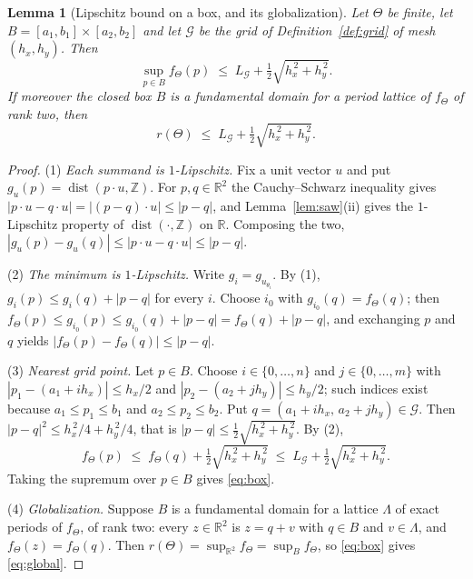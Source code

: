 \documentclass[11pt]{article}
\theoremstyle{plain}
\newtheorem{lemma}[theorem]{Lemma}
\theoremstyle{definition}
\theoremstyle{remark}
\newcommand{\dZ}{\operatorname{dist}}
\newcommand{\R}{\mathbb{R}}
\newcommand{\Z}{\mathbb{Z}}
\begin{document}
\begin{lemma}[Lipschitz bound on a box, and its globalization]
\label{lem:box}
Let $\Theta$ be finite, let $B=[a_1,b_1]\times[a_2,b_2]$ and let $\mathcal{G}$ be the grid of
Definition~\ref{def:grid} of mesh $(h_x,h_y)$. Then
\begin{equation}
\sup_{p\in B}f_\Theta(p)\;\le\;L_{\mathcal{G}}+\tfrac12\sqrt{h_x^{\,2}+h_y^{\,2}} .
\label{eq:box}
\end{equation}
If moreover the closed box $B$ is a fundamental domain for a period lattice of $f_\Theta$ of rank two,
then
\begin{equation}
r(\Theta)\;\le\;L_{\mathcal{G}}+\tfrac12\sqrt{h_x^{\,2}+h_y^{\,2}} .
\label{eq:global}
\end{equation}
\end{lemma}

\begin{proof}
(1) \emph{Each summand is $1$-Lipschitz.} Fix a unit vector $u$ and put
$g_u(p)=\dZ(p\cdot u,\Z)$. For $p,q\in\R^2$ the Cauchy--Schwarz inequality gives
$|p\cdot u-q\cdot u|=|(p-q)\cdot u|\le|p-q|$, and Lemma~\ref{lem:saw}(ii) gives the $1$-Lipschitz
property of $\dZ(\cdot,\Z)$ on $\R$. Composing the two,
$|g_u(p)-g_u(q)|\le|p\cdot u-q\cdot u|\le|p-q|$.

(2) \emph{The minimum is $1$-Lipschitz.} Write $g_i=g_{u_{\theta_i}}$. By (1),
$g_i(p)\le g_i(q)+|p-q|$ for every $i$. Choose $i_0$ with $g_{i_0}(q)=f_\Theta(q)$; then
$f_\Theta(p)\le g_{i_0}(p)\le g_{i_0}(q)+|p-q|=f_\Theta(q)+|p-q|$, and exchanging $p$ and $q$ yields
$|f_\Theta(p)-f_\Theta(q)|\le|p-q|$.

(3) \emph{Nearest grid point.} Let $p\in B$. Choose $i\in\{0,\dots,n\}$ and $j\in\{0,\dots,m\}$ with
$|p_1-(a_1+ih_x)|\le h_x/2$ and $|p_2-(a_2+jh_y)|\le h_y/2$; such indices exist because
$a_1\le p_1\le b_1$ and $a_2\le p_2\le b_2$. Put $q=(a_1+ih_x,\,a_2+jh_y)\in\mathcal{G}$. Then
$|p-q|^2\le h_x^{\,2}/4+h_y^{\,2}/4$, that is $|p-q|\le\tfrac12\sqrt{h_x^{\,2}+h_y^{\,2}}$. By (2),
\[
f_\Theta(p)\;\le\;f_\Theta(q)+\tfrac12\sqrt{h_x^{\,2}+h_y^{\,2}}
\;\le\;L_{\mathcal{G}}+\tfrac12\sqrt{h_x^{\,2}+h_y^{\,2}} .
\]
Taking the supremum over $p\in B$ gives \eqref{eq:box}.

(4) \emph{Globalization.} Suppose $B$ is a fundamental domain for a lattice $\Lambda$ of exact periods
of $f_\Theta$, of rank two: every $z\in\R^2$ is $z=q+v$ with $q\in B$ and $v\in\Lambda$, and
$f_\Theta(z)=f_\Theta(q)$. Then $r(\Theta)=\sup_{\R^2}f_\Theta=\sup_{B}f_\Theta$, so \eqref{eq:box}
gives \eqref{eq:global}.
\end{proof}
\end{document}
